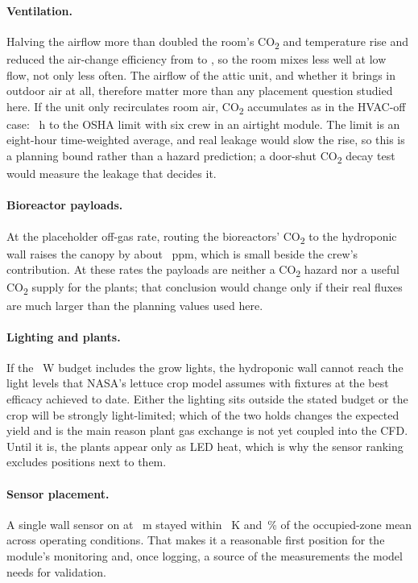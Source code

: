 \documentclass[11pt]{article}
\begin{document}
\paragraph{Ventilation.} Halving the airflow more than doubled the room's CO\textsubscript{2} and temperature rise
and reduced the air-change efficiency from \BaseACE{} to \SfiveaACE, so the room mixes less well at low flow, not
only less often. The airflow of the attic unit, and whether it brings in outdoor air at all, therefore matter more
than any placement question studied here. If the unit only recirculates room air, CO\textsubscript{2} accumulates as
in the HVAC-off case: \SthreeSixCrew~h to the OSHA limit with six crew in an airtight module. The limit is an
eight-hour time-weighted average, and real leakage would slow the rise, so this is a planning bound rather than a
hazard prediction; a door-shut CO\textsubscript{2} decay test would measure the leakage that decides it.

\paragraph{Bioreactor payloads.} At the placeholder off-gas rate, routing the bioreactors' CO\textsubscript{2}
to the hydroponic wall raises the canopy by about \OffgasCanopyNFT~ppm, which is small beside the crew's contribution.
At these rates the payloads are neither a CO\textsubscript{2} hazard nor a useful CO\textsubscript{2} supply for the
plants; that conclusion would change only if their real fluxes are much larger than the planning values used here.

\paragraph{Lighting and plants.} If the \LoadMax~W budget includes the grow lights, the hydroponic wall cannot reach
the light levels that NASA's lettuce crop model assumes with fixtures at the best efficacy achieved to date. Either the lighting sits outside
the stated budget or the crop will be strongly light-limited; which of the two holds changes the expected yield and is
the main reason plant gas exchange is not yet coupled into the CFD. Until it is, the plants appear only as LED heat,
which is why the sensor ranking excludes positions next to them.

\paragraph{Sensor placement.} A single wall sensor on \SensorWhere{} at \SensorZ~m stayed within \SensorT~K and
\SensorCOTwo\,\% of the occupied-zone mean across \SensorRuns{} operating conditions. That makes it a reasonable first
position for the module's monitoring and, once logging, a source of the measurements the model needs for validation.
\end{document}
